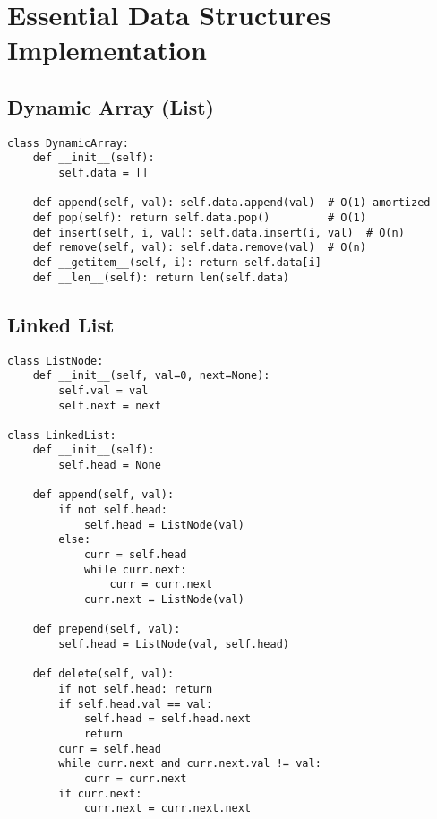 \section{Essential Data Structures Implementation}

\subsection{Dynamic Array (List)}
\begin{verbatim}
class DynamicArray:
    def __init__(self):
        self.data = []
    
    def append(self, val): self.data.append(val)  # O(1) amortized
    def pop(self): return self.data.pop()         # O(1)
    def insert(self, i, val): self.data.insert(i, val)  # O(n)
    def remove(self, val): self.data.remove(val)  # O(n)
    def __getitem__(self, i): return self.data[i]
    def __len__(self): return len(self.data)
\end{verbatim}

\subsection{Linked List}
\begin{verbatim}
class ListNode:
    def __init__(self, val=0, next=None):
        self.val = val
        self.next = next

class LinkedList:
    def __init__(self):
        self.head = None
    
    def append(self, val):
        if not self.head:
            self.head = ListNode(val)
        else:
            curr = self.head
            while curr.next:
                curr = curr.next
            curr.next = ListNode(val)
    
    def prepend(self, val):
        self.head = ListNode(val, self.head)
    
    def delete(self, val):
        if not self.head: return
        if self.head.val == val:
            self.head = self.head.next
            return
        curr = self.head
        while curr.next and curr.next.val != val:
            curr = curr.next
        if curr.next:
            curr.next = curr.next.next
\end{verbatim}

